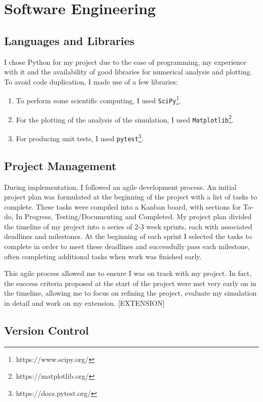 \documentclass[12pt,a4paper]{report}
\begin{document}
\section{Software Engineering}\label{section:software}

\subsection{Languages and Libraries}

I chose Python for my project due to the ease of programming, my experience with it and the availability of good libraries for numerical analysis and plotting. To avoid code duplication, I made use of a few libraries:

\begin{enumerate}
 	\item To perform some scientific computing, I used \verb|SciPy|\footnote{https://www.scipy.org/}.
	\item For the plotting of the analysis of the simulation, I used \verb|Matplotlib|\footnote{https://matplotlib.org/}. 
	\item For producing unit tests, I used \verb|pytest|\footnote{https://docs.pytest.org/}.
\end{enumerate}

\subsection{Project Management}

During implementation, I followed an agile development process. An initial project plan was formulated at the beginning of the project with a list of tasks to complete. These tasks were compiled into a Kanban board, with sections for To-do, In Progress, Testing/Documenting and Completed. My project plan divided the timeline of my project into a series of 2-3 week sprints, each with associated deadlines and milestones. At the beginning of each sprint I selected the tasks to complete in order to meet these deadlines and successfully pass each milestone, often completing additional tasks when work was finished early.

This agile process allowed me to ensure I was on track with my project. In fact, the success criteria proposed at the start of the project were met very early on in the timeline, allowing me to focus on refining the project, evaluate my simulation in detail and work on my extension. [EXTENSION]

\subsection{Version Control}
\end{document}
